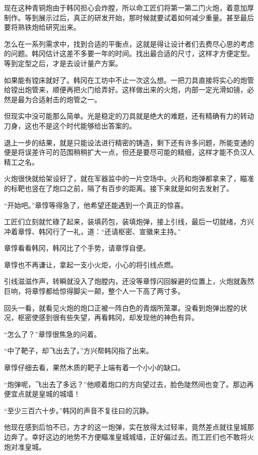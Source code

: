 现在这种青铜炮由于韩冈担心会炸膛，所以命工匠们将第一第二门火炮，着意加厚制作。等到展示过后，真正的研发开始，那时候就要试着如何减少重量。甚至最后要将熟铁炮给研究出来。

怎么在一系列需求中，找到合适的平衡点，这就是得让设计者们去费尽心思的考虑的问题。韩冈估计这差不多要一年的时间。找出最合适的尺寸，这样才方便定型。等到定型之后，才是去设计量产方案。

如果能有镗床就好了。韩冈在工坊中不止一次这么想。一把刀具直接将实心的炮管给镗出炮管来，顺便再把火门给弄好。这样做出来的火炮，内部一定光滑如镜，必然是最为合适射击的炮管之一。

但现实中没可能那么简单。光是稳定的刀具就是绝大的难题，还有精确有力的转动刀身，这也不是这个时代能够给出答案的。

退上一步的结果，就是只能设法进行精密的铸造，剩下还有许多问题，所能变通的便是将误差许可的范围稍稍扩大一点，但还是要尽可能的精细，这样才能不负汉人精工之名。

火炮很快就给架设好了，就在军器监中的一片空场中。火药和炮弹都拿来了，瞄准的标靶也竖在了炮口之前，隔了有百步的距离。接下来就是如何去发射了。

“开始吧。”章惇等得急了，他希望还能遇到一个真正的惊喜。

工匠们立刻就忙碌了起来，装填药包，装填炮弹，接上引线，最后一切就绪，方兴冲着章惇、韩冈行了一礼，道：“还请枢密、宣徽来主持。”

章惇看看韩冈，韩冈比了个手势，请章惇自便。

章惇也不再谦让，拿起一支小火炬，小心的将引线点燃。

引线滋滋作声，转瞬就没入了炮膛内，还没等章惇闪回躲避的位置上，火炮就轰然巨响，将章惇都给惊得脚尖一颠，整个人一下高了两寸多。

回头一看，就看见火炮的炮口正被一阵白色的青烟所笼罩。没看到炮弹出膛的状况，枢密使感到很有些失望，再看韩冈，却发现他的神色有异。

“怎么了？”章惇很焦急的问着。

“中了靶子，却飞出去了。”方兴帮韩冈指了出来。

章惇仔细去看，果然木质的靶子上端有着一个小小的缺口。

“炮弹呢，飞出去了多远？”他顺着炮口的方向望过去，脸色陡然间也变了。那边再便宜点就是皇城的城墙！

“至少三百六十步。”韩冈的声音不复往曰的沉静。

他现在感到后怕不已，方才的这一炮弹，实在放得太过轻率，竟然差点就往皇城那边奔了。幸好这边的地势不方便瞄准皇城城墙，正好偏过去。而工匠们也不敢将火炮对准皇城。

